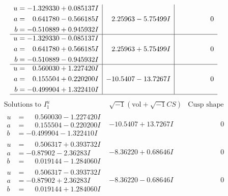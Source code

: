 \documentclass[1p]{elsarticle_modified}
\theoremstyle{definition}
\newcommand{\I}{\sqrt{-1}}
\begin{document}
$$\begin{array}{c|c|c}
\begin{aligned}
u &= -1.329330 + 0.085137 I \\
a &= \phantom{-}0.641780 - 0.566185 I \\
b &= -0.510889 + 0.945932 I\end{aligned}
 & \phantom{-}2.25963 - 5.75499 I & \phantom{-0.000000 } 0 \\ \hline\begin{aligned}
u &= -1.329330 - 0.085137 I \\
a &= \phantom{-}0.641780 + 0.566185 I \\
b &= -0.510889 - 0.945932 I\end{aligned}
 & \phantom{-}2.25963 + 5.75499 I & \phantom{-0.000000 } 0 \\ \hline\begin{aligned}
u &= \phantom{-}0.560030 + 1.227420 I \\
a &= \phantom{-}0.155504 + 0.220200 I \\
b &= -0.499904 + 1.322410 I\end{aligned}
 & -10.5407 - 13.7267 I & \phantom{-0.000000 } 0\\
 \hline 
 \end{array}$$\newpage$$\begin{array}{c|c|c}  
\text{Solutions to }I^u_{1}& \I (\text{vol} + \sqrt{-1}CS) & \text{Cusp shape}\\
 \hline 
\begin{aligned}
u &= \phantom{-}0.560030 - 1.227420 I \\
a &= \phantom{-}0.155504 - 0.220200 I \\
b &= -0.499904 - 1.322410 I\end{aligned}
 & -10.5407 + 13.7267 I & \phantom{-0.000000 } 0 \\ \hline\begin{aligned}
u &= \phantom{-}0.506317 + 0.393732 I \\
a &= -0.87902 - 2.36283 I \\
b &= \phantom{-}0.019144 - 1.284060 I\end{aligned}
 & -8.36220 + 0.68646 I & \phantom{-0.000000 } 0 \\ \hline\begin{aligned}
u &= \phantom{-}0.506317 - 0.393732 I \\
a &= -0.87902 + 2.36283 I \\
b &= \phantom{-}0.019144 + 1.284060 I\end{aligned}
 & -8.36220 - 0.68646 I & \phantom{-0.000000 } 0 \\ \hline\begin{aligned}

\end{aligned}
\end{array}$$
\end{document}
